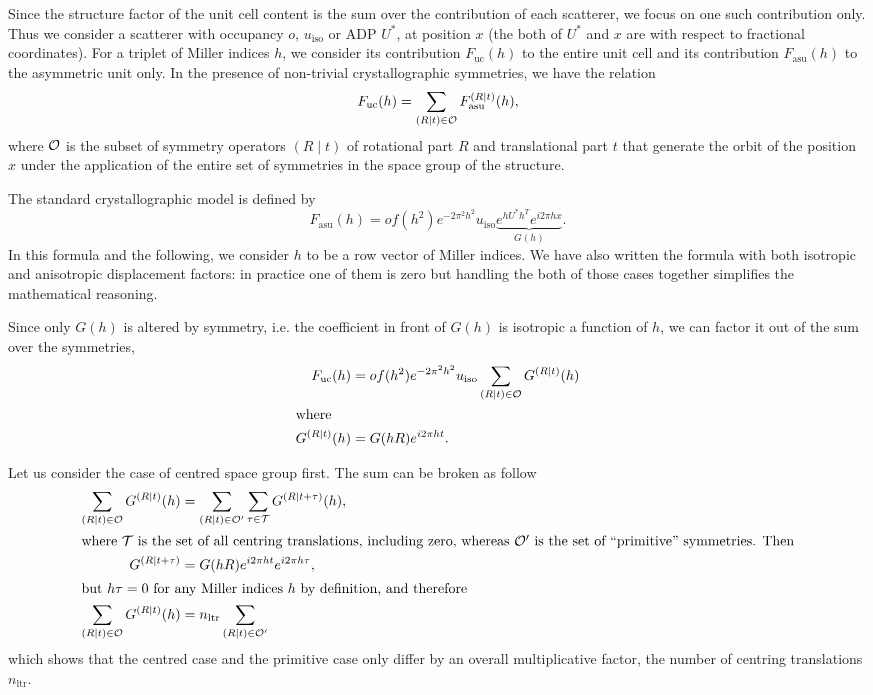 \documentclass[11pt]{article}
\begin{document}
\newcommand{\Fuc}{F_{\text{uc}}}
\newcommand{\Fasu}{F_{\text{asu}}}
Since the structure factor of the unit cell content is the sum over the contribution of each scatterer, we focus on one such contribution only. Thus we consider a scatterer with occupancy $o$, $u_{\text{iso}}$ or ADP $U^*$, at position $x$ (the both of $U^*$ and $x$ are with respect to fractional coordinates). For a triplet of Miller indices $h$, we consider its contribution $\Fuc(h)$ to the entire unit cell and its contribution $\Fasu(h)$ to the asymmetric unit only. In the presence of non-trivial crystallographic symmetries, we have the relation
\begin{equation}
\Fuc(h) = \sum_{(R \mid t) \in \cal{O}} \Fasu^{(R \mid t)}(h),
\end{equation}
where $\cal{O}$ is the subset of symmetry operators $(R \mid t)$ of rotational part $R$ and translational part $t$ that generate the orbit of the position $x$ under the application of the entire set of symmetries in the space group of the structure.

The standard crystallographic model is defined by
\begin{equation}
\Fasu(h) = o f(h^2) e^{-2\pi^2 h^2} u_{\text{iso}} \underbrace{e^{h U^* h^T} e^{i 2\pi h x}}_{G(h)}.
\end{equation}
In this formula and the following, we consider $h$ to be a row vector of Miller indices. We have also written the formula with both isotropic and anisotropic displacement factors: in practice one of them is zero but handling the both of those cases together simplifies the mathematical reasoning.

Since only $G(h)$ is altered by symmetry, i.e. the coefficient in front of $G(h)$ is isotropic a function of $h$, we can factor it out of the sum over the symmetries,
\begin{align}
\Fuc(h) &= o f(h^2) e^{-2\pi^2 h^2} u_{\text{iso}} \sum_{(R \mid t) \in \cal{O}} G^{(R \mid t)}(h) \\
\intertext{where}
G^{(R \mid t)}(h) &= G(hR) e^{i 2\pi ht}.
\end{align}

Let us consider the case of centred space group first. The sum can be broken as follow
\begin{align}
 \sum_{(R \mid t) \in \cal{O}} G^{(R \mid t)}(h) &=  \sum_{(R \mid t) \in \cal{O'}} \sum_{\tau \in \cal{T}} G^{(R \mid t+\tau)}(h), \nonumber\\
\intertext{where $\cal{T}$ is the set of all centring translations, including zero, whereas $\cal{O'}$ is the set of ``primitive'' symmetries. Then}
G^{(R \mid t + \tau)} &= G(hR) e^{i2\pi ht} e^{i2\pi h\tau}, \nonumber \\
\intertext{but $h\tau=0$ for any Miller indices $h$ by definition, and therefore}
\sum_{(R \mid t) \in \cal{O}} G^{(R \mid t)}(h) &= n_{\text{ltr}} \sum_{(R \mid t) \in \cal{O'}}
\end{align}
which shows that the centred case and the primitive case only differ by an overall multiplicative factor, the number of centring translations $n_{\text{ltr}}$.
\end{document}
